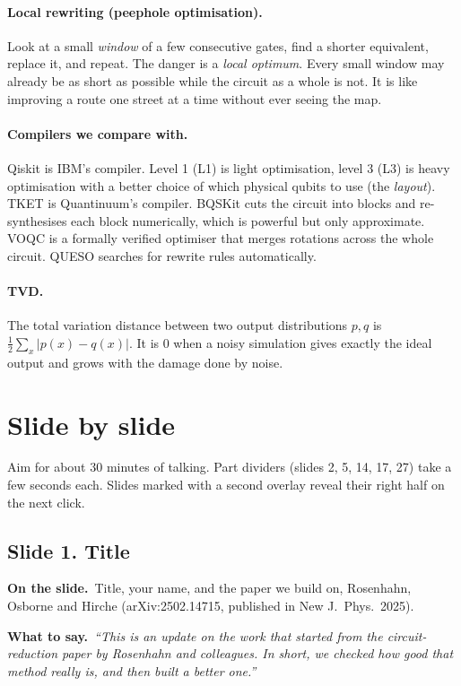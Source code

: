 \documentclass[11pt,a4paper]{article}
\newcommand{\say}[1]{\emph{``#1''}}
\newcommand{\slide}[2]{\subsection*{Slide #1. #2}}
\newcommand{\shows}{\par\textbf{\color{ibar}On the slide.}\ }
\newcommand{\tosay}{\par\textbf{\color{ibar}What to say.}\ }
\begin{document}
\paragraph{Local rewriting (peephole optimisation).} Look at a small \emph{window} of a few consecutive gates, find a shorter
equivalent, replace it, and repeat. The danger is a \emph{local optimum}. Every small window may already be as short as
possible while the circuit as a whole is not. It is like improving a route one street at a time without ever seeing the map.

\paragraph{Compilers we compare with.} Qiskit is IBM's compiler. Level 1 (L1) is light optimisation, level 3 (L3) is heavy
optimisation with a better choice of which physical qubits to use (the \emph{layout}). TKET is Quantinuum's compiler.
BQSKit cuts the circuit into blocks and re-synthesises each block numerically, which is powerful but only approximate.
VOQC is a formally verified optimiser that merges rotations across the whole circuit. QUESO searches for rewrite rules
automatically.

\paragraph{TVD.} The total variation distance between two output distributions $p,q$ is $\tfrac12\sum_x|p(x)-q(x)|$. It
is 0 when a noisy simulation gives exactly the ideal output and grows with the damage done by noise.

\section{Slide by slide}\label{sec:slides}

Aim for about 30 minutes of talking. Part dividers (slides 2, 5, 14, 17, 27) take a few seconds each. Slides marked with
a second overlay reveal their right half on the next click.

\slide{1}{Title}
\shows Title, your name, and the paper we build on, Rosenhahn, Osborne and Hirche (arXiv:2502.14715, published in New
J.\ Phys.\ 2025).
\tosay \say{This is an update on the work that started from the circuit-reduction paper by Rosenhahn and colleagues. In
short, we checked how good that method really is, and then built a better one.}
\end{document}
